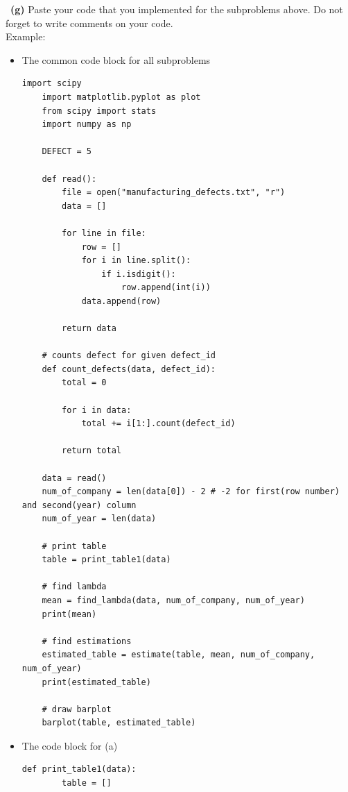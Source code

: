 \documentclass[a4 paper]{article}
\numberwithin{equation}{section}
\newcommand{\subproblem}[1]{~\newline\textbf{(#1)}}
\newcommand{\0}{\mathbf{0}}
\begin{document}
	\subproblem{g} Paste your code that you implemented for the subproblems above. Do not forget to write comments on your code.\\
	Example:\\
	\begin{itemize}
	
	\item The common code block for all subproblems\\
	\begin{lstlisting}[label={list:first},caption=The common code - Import modules and File operations]
    import scipy
    import matplotlib.pyplot as plot
    from scipy import stats
    import numpy as np
    
    DEFECT = 5
    
    def read():
        file = open("manufacturing_defects.txt", "r")
        data = []
    
        for line in file:
            row = []
            for i in line.split():
                if i.isdigit():
                    row.append(int(i))
            data.append(row)
        
        return data
    
    # counts defect for given defect_id
    def count_defects(data, defect_id):
        total = 0
    
        for i in data:
            total += i[1:].count(defect_id)
            
        return total
    
    data = read()
    num_of_company = len(data[0]) - 2 # -2 for first(row number) and second(year) column
    num_of_year = len(data)
    
    # print table
    table = print_table1(data)
    
    # find lambda
    mean = find_lambda(data, num_of_company, num_of_year)
    print(mean)
    
    # find estimations
    estimated_table = estimate(table, mean, num_of_company, num_of_year)
    print(estimated_table)
    
    # draw barplot
    barplot(table, estimated_table)
    \end{lstlisting}
	
	\item The code block for (a)\\
	\begin{lstlisting}[label={list:first},caption=The code block a - Compute the values in Table 1 and Print table]
	def print_table1(data):
        table = []
    

\end{lstlisting}
\end{itemize}
\end{document}
